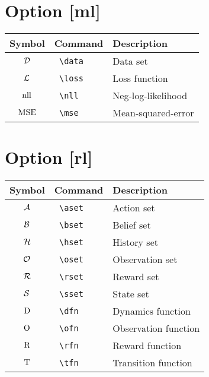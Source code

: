 \documentclass{article}
\begin{document}
\section*{Option [ml]}

\begin{tabular}{cll}
  Symbol & Command & Description \\
  \hline
  ${\mathcal{D}}$ & \texttt{ \textbackslash data } & Data set \\
  $\mathcal{L}$ & \texttt{ \textbackslash loss } & Loss function \\
  ${\operatorname{nll}}$ & \texttt{ \textbackslash nll } & Neg-log-likelihood \\
  ${\operatorname{MSE}}$ & \texttt{ \textbackslash mse } & Mean-squared-error \\
\end{tabular}

\section*{Option [rl]}

\begin{tabular}{cll}
  Symbol & Command & Description \\
  \hline
  $\mathcal{A}$ & \texttt{ \textbackslash aset } & Action set \\
  $\mathcal{B}$ & \texttt{ \textbackslash bset } & Belief set \\
  $\mathcal{H}$ & \texttt{ \textbackslash hset } & History set \\
  $\mathcal{O}$ & \texttt{ \textbackslash oset } & Observation set \\
  $\mathcal{R}$ & \texttt{ \textbackslash rset } & Reward set \\
  $\mathcal{S}$ & \texttt{ \textbackslash sset } & State set \\
  $\mathrm{D}$ & \texttt{ \textbackslash dfn } & Dynamics function \\
  $\mathrm{O}$ & \texttt{ \textbackslash ofn } & Observation function \\
  $\mathrm{R}$ & \texttt{ \textbackslash rfn } & Reward function \\
  $\mathrm{T}$ & \texttt{ \textbackslash tfn } & Transition function \\
\end{tabular}
\end{document}

